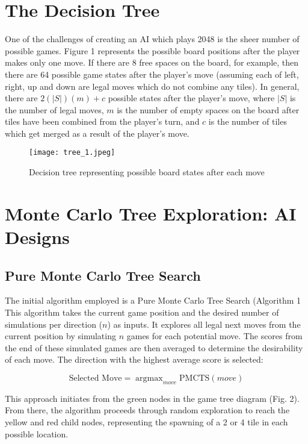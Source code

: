 \documentclass{article}
\DeclareMathOperator*{\argmax}{argmax}
\begin{document}
\section{The Decision Tree}

One of the challenges of creating an AI which plays 2048 is the sheer number of possible games.  Figure 1 represents the possible board positions after the player makes only one move.  If there are 8 free spaces on the board, for example, then there are 64 possible game states after the player's move (assuming each of left, right, up and down are legal moves which do not combine any tiles).  In general, there are $2(|S|)(m) + c$ possible states after the player's move, where $|S|$ is the number of legal moves,  $m$ is the number of empty spaces on the board after tiles have been combined from the player's turn, and $c$ is the number of tiles which get merged as a result of the player's move.

\begin{figure}[H]
\centering
\texttt{[image: tree\_1.jpeg]}
\caption{Decision tree representing possible board states after each move}
\label{fig:tree1}
\end{figure}

\section{Monte Carlo Tree Exploration: AI Designs}
\subsection{Pure Monte Carlo Tree Search}
The initial algorithm employed is a Pure Monte Carlo Tree Search (Algorithm 1 This algorithm takes the current game position and the desired number of simulations per direction ($n$) as inputs. It explores all legal next moves from the current position by simulating $n$ games for each potential move. The scores from the end of these simulated games are then averaged to determine the desirability of each move. The direction with the highest average score is selected: 

\begin{equation}
\label{PMCTS_move_selection}
  \textrm{Selected Move} = \argmax_{move} \text{PMCTS}(move)
\end{equation}


This approach initiates from the green nodes in the game tree diagram (Fig. 2). From there, the algorithm proceeds through random exploration to reach the yellow and red child nodes, representing the spawning of a 2 or 4 tile in each possible location.
\end{document}
